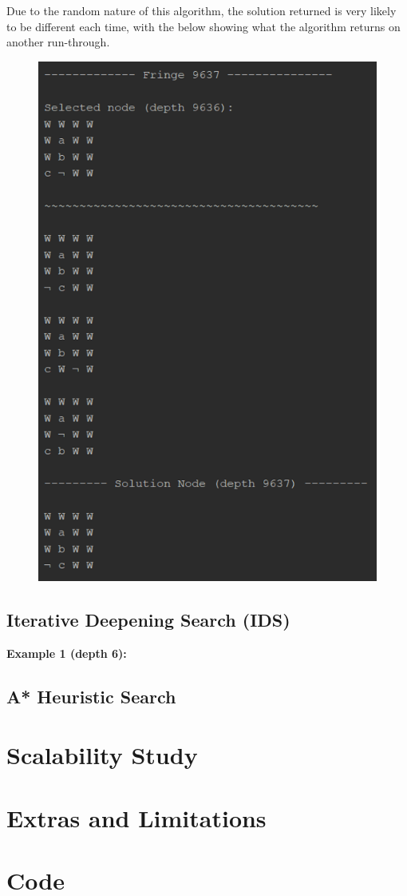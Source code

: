 \documentclass{article}
\begin{document}
	\newpage
	Due to the random nature of this algorithm, the solution returned is very likely to be different each time, with the below showing what the algorithm returns on another run-through.
	
	\begin{figure}[h]	
		\centering
		\includegraphics[height=0.6\textheight,keepaspectratio]{DFS-2-5.png}
	\end{figure}
	
	\newpage
	\subsection{Iterative Deepening Search (IDS)}
	\textbf{Example 1 (depth 6):}
	
	\subsection{A* Heuristic Search}
	
	\section{Scalability Study}
	
	\section{Extras and Limitations}
	
	\section{Code}
	
\end{document}
